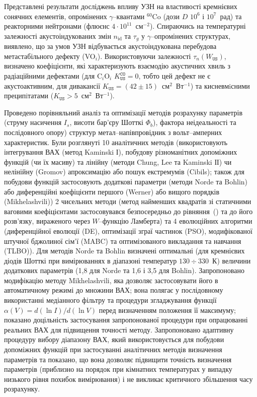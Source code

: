 Представлені результати досліджень впливу УЗН на властивості кремнієвих сонячних елементів,
опромінених $\gamma$--квантами $^{60}$Co (дози $D$ $10^6$ і $10^7$~рад) та реакторними нейтронами (флюєнс $4\cdot10^{11}$~см$^{-2}$).
Спираючись на температурні залежності акустоіндукованих змін $n_\mathrm{id}$ та $\tau_{g}$ у $\gamma$--опромінених структурах, виявлено, що за умов УЗН відбувається акустоіндукована перебудова метастабільного дефекту (VO$_i$).
Використовуючи залежності $\tau_n(W_\mathtt{US})$,  визначено коефіцієнти, які характеризують взаємодію акустичних хвиль з радіаційними дефектами (для C$_i$O$_i$ $K_\mathtt{US}^\mathtt{CO}=0$, тобто цей дефект не є акустоактивним,
для дивакансії $K_\mathtt{US}=(42\pm15)$~см$^2$~Вт$^{-1}$)
та кисневмiсними преципiтатами ($K_\mathtt{US}>5$~см$^2$~Вт$^{-1}$).

Проведено порівняльний аналіз та оптимізації методів розрахунку параметрів (струму насичення  $I_s$, висоти бар'єру Шотткі  $\Phi_b$), фактора неідеальності та послідовного опору) структур метал--напівпровідник з вольт--амперних характеристик.
Були розглянуті 10 аналітичних методів (використовують інтегрування ВАХ (метод Kaminski І), побудову різноманітних допоміжних функцій (чи їх масиву) та лінійну (методи Chung, Lee та Kaminski ІІ) чи нелінійну (Gromov) апроксимацію або пошук екстремумів (Cibils);
також для побудови функцій застосовують додаткові параметри (методи Norde та Bohlin) або диференційні коефіцієнти першого (Werner) або вищого порядків (Mikhelashvili))
2 чисельних методи (метод найменших квадратів зі статичними ваговими коефіцієнтами застосовувався безпосередньо до рівняння~() та до його розв'язку, вираженого через $W$--функцію Ламберта) та
4 еволюційних алгоритми (диференційної еволюції (DE),
оптимізації зграї частинок (PSO),
модифікованої штучної бджолиної сім'ї (MABC) та
оптимізованого викладання та навчання (TLBO)).
Для методів Norde та Bohlin визначені  оптимальні (для кремнієвих діодів Шотткі при вимірюваннях в діапазоні температур $130\div330$~К) величини додаткових параметрів (1,8 для Norde та 1,6 і 3,5 для Bohlin).
Запропоновано модифікацію методу Mikhelashvili, яка дозволяє застосовувати його в автоматичному режимі до множини ВАХ;
вона полягає у послідовному використанні медіанного фільтру та процедури згладжування функції $\alpha(V)=d(\ln I)/d(\ln V)$ перед визначенням положення її максимуму;
показано доцільність застосування запропонованої процедури при опрацюванні реальних ВАХ для підвищення точності методу.
Запропоновано адаптивну процедуру вибору діапазону ВАХ, який використовується для побудови допоміжних функцій при застосуванні аналітичних методів визначення параметрів та показано, що вона дозволяє підвищити точність визначення параметрів (приблизно на порядок при кімнатних температурах у випадку низького рівня похибок вимірювання) і не викликає критичного збільшення часу розрахунку.
